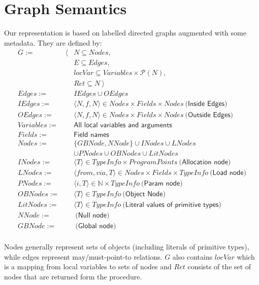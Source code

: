 \section{Graph Semantics}
Our representation is based on labelled directed graphs augmented with some
metadata. They are defined by:
\begin{eqnarray*}
    G           := &\langle& N \subseteq Nodes, \\
                   && E \subseteq Edges, \\
                   && locVar \subseteq Variables \times \mathcal{P}(N), \\
                   && Ret \subseteq N ~ \rangle \\
    Edges       := && IEdges \cup OEdges  \\
    IEdges      := && \langle N, f, N \rangle \in Nodes \times Fields \times Nodes ~\textsf{(Inside Edges)} \\
    OEdges      := && \langle N, f, N \rangle \in Nodes \times Fields \times Nodes ~\textsf{(Outside Edges)} \\
    Variables   := && \textsf{All local variables and arguments} \\
    Fields      := && \textsf{Field names} \\
    Nodes       := && \{ GBNode, NNode \} \cup INodes \cup LNodes \\
                   && \cup PNodes \cup OBNodes \cup LitNodes \\
    INodes      := && \langle T \rangle \in TypeInfo \times ProgramPoints ~ \textsf{(Allocation node)} \\
    LNodes      := && \langle from, via, T \rangle \in Nodes \times Fields \times TypeInfo ~ \textsf{(Load node)} \\
    PNodes      := && \langle i, T \rangle  \in \mathbb{N} \times TypeInfo ~ \textsf{(Param node)} \\
    OBNodes     := && \langle T \rangle \in TypeInfo ~ \textsf{(Object Node)} \\
    LitNodes    := && \langle T \rangle \in TypeInfo ~ \textsf{(Literal values of primitive types)} \\
    NNode       := && ~ \textsf{(Null node)} \\
    GBNode      := && ~ \textsf{(Global node)} \\
\end{eqnarray*}

Nodes generally represent sets of objects (including literals of primitive
types), while edges represent may/must-point-to relations. $G$ also contains
$locVar$ which is a mapping from local variables to sets of nodes and $Ret$
consists of the set of nodes that are returned form the procedure.

